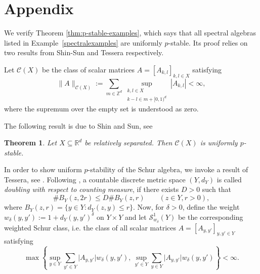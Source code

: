\documentclass{amsart}
\newtheorem{theorem}{Theorem}
\begin{document}

\section*{Appendix}

We verify Theorem \ref{thm:p-stable-examples}, which says that all spectral algebras listed in
Example~\ref{spectralexamples} are uniformly $p$-stable. Its proof relies on two results from Shin-Sun and Tessera respectively. 

Let \(\mathcal{C}(X)\) be the class of scalar matrices \(A=[A_{k,l}]_{k,l \in X}\) satisfying
\[
 \|A\|_{\mathcal{C}(X)} := \sum_{m\in\mathbb{Z}^d}
 \sup_{\substack{k,l\in X \\
                  k-l\in m+[0,1)^d}}
 |A_{k,l}| <\infty,
\]
where the supremum over the empty set is understood as zero.

The following result is due to Shin and Sun, see \cite[Theorem~2.1]{ShiSun09}

\begin{theorem}\label{thm:shin-sun}\cite{ShiSun09}
Let \(X\subseteq\mathbb R^d\) be relatively separated. Then \(\mathcal{C}(X)\) is uniformly $p$-stable. 
\end{theorem}

In order to show uniform $p$-stability of the Schur algebra, we invoke a result of Tessera, see \cite[Corollary~1.7]{TESSERA20102793}. Following \cite{TESSERA20102793}, a countable discrete metric space $(Y,d_Y)$ is called \emph{doubling with respect to counting measure}, if there exists $D>0$ such that
\begin{equation}\label{doubling}
\# B_{Y}(z,2r) \leq D \# B_Y(z,r)  \qquad (z\in Y, r>0),
\end{equation}
where $B_Y(z,r) = \lbrace y\in Y: d_Y(z,y) \leq r \rbrace$. Now, for $\delta >0$, define the weight $w_\delta(y,y') := 1 + d_Y(y,y')^\delta$ on $Y\times Y$ and let $\mathcal{S}^1_{w_\delta}(Y)$ be the corresponding weighted Schur class, i.e. the class of all scalar matrices $A=[A_{y,y'}]_{y,y'\in Y}$ satisfying
$$\max\left\{ \sup_{y\in Y}\sum_{y'\in Y} \vert A_{y,y'}\vert w_\delta(y,y'),\, \sup_{y'\in Y}\sum_{y\in Y} \vert A_{y,y'}\vert w_\delta(y,y') \right\} <\infty.$$
\end{document}
